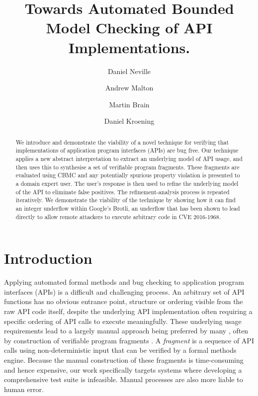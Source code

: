 \documentclass[EPiCempty]{easychair}
\title{Towards Automated Bounded Model Checking of API Implementations.}
\author{
Daniel Neville \inst{1, 2, 3}
\and
    Andrew Malton\inst{1, 4}
\and
   Martin Brain\inst{2, 5}
\and 
	Daniel Kroening\inst {2,6}
}
\institute{
	CHACE Centre for High Assurance Computing, Blackberry Ltd.,  Waterloo, Canada
\and
   University of Oxford,
   Oxford, U.K.\\
\and
  \email{daniel.neville@cs.ox.ac.uk}\\
\and
  \email{amalton@blackberry.com}\\
\and
   \email{martin.brain@cs.ox.ac.uk}\\
\and
	\email{kroening@cs.ox.ac.uk}\\
 }
\begin{document}
\maketitle

\begin{abstract}
We introduce and demonstrate the viability of a novel technique for verifying that implementations of application program interfaces (APIs) are bug free.  Our technique applies a new abstract interpretation to extract an underlying model of API usage, and then uses this to synthesise a set of verifiable program fragments. These fragments are evaluated using CBMC and any potentially spurious property violation is presented to a domain expert user.  The user's response is then used to refine the underlying model of the API to eliminate false positives.
The refinement-analysis process is repeated iteratively.   We demonstrate the viability of the technique by showing how it can find an integer underflow within Google's Brotli, an underflow that has been shown to lead directly to allow remote attackers to execute arbitrary code in CVE 2016-1968. 
\end{abstract}


\section{Introduction}
\label{sect:introduction}
Applying automated formal methods and bug checking to application program interfaces (APIs) is a difficult and challenging process.  
An arbitrary set of API functions has no obvious entrance point, structure or ordering visible from the raw API code itself, despite the underlying API implementation often requiring  a specific ordering of API calls to execute meaningfully.     
These underlying usage requirements lead to a largely manual approach being  preferred by many \cite{BestAPITestingPractices}, often by construction of verifiable program fragments \cite{HowToTest}.  A \textit{fragment} is a sequence of API calls using non-deterministic input that can be verified by a formal methods engine.
Because the manual construction of these fragments is time-consuming and hence expensive, our work specifically targets systems where developing a comprehensive test suite is infeasible.  Manual processes are also more liable to human error.
   
\end{document}
